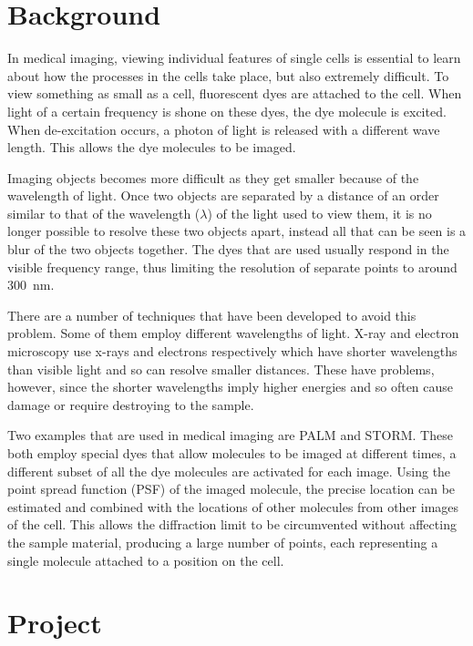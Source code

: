 \section{Background}
\label{sec:background}

In medical imaging, viewing individual features of single cells is essential to
learn about how the processes in the cells take place, but also extremely
difficult. To view something as small as a cell, fluorescent dyes are attached
to the cell. When light of a certain frequency is shone on these dyes, the dye
molecule is excited. When de-excitation occurs, a photon of light is released
with a different wave length. This allows the dye molecules to be imaged.

Imaging objects becomes more difficult as they get smaller because of the
wavelength of light. Once two objects are separated by a distance of an order
similar to that of the wavelength ($\lambda$) of the light used to view them,
it is no longer possible to resolve these two objects apart, instead all that
can be seen is a blur of the two objects together. The dyes that are used
usually respond in the visible frequency range, thus limiting the resolution of
separate points to around \SI{300}{\nano\metre}.

There are a number of techniques that have been developed to avoid this
problem. Some of them employ different wavelengths of light. X-ray and electron
microscopy use x-rays and electrons respectively which have shorter wavelengths
than visible light and so can resolve smaller distances. These have problems,
however, since the shorter wavelengths imply higher energies and so often
cause damage or require destroying to the sample.

Two examples that are used in medical imaging are PALM\cite{owen2010palm} and
STORM\cite{rust2006sub}. These both employ special dyes that allow molecules to
be imaged at different times, a different subset of all the dye molecules are
activated for each image. Using the point spread function (PSF) of the imaged
molecule, the precise location can be estimated and combined with the locations
of other molecules from other images of the cell. This allows the diffraction
limit to be circumvented without affecting the sample material, producing a
large number of points, each representing a single molecule attached to a
position on the cell.

\section{Project}
\label{sec:project}

